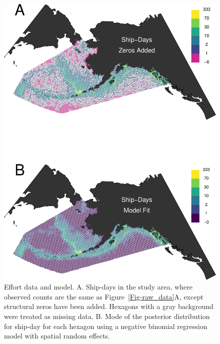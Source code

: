 \documentclass[11pt, titlepage]{article}
\begin{document}
\begin{spacing}{1.9}
\begin{flushleft}
\begin{figure}[H]
  \begin{center}
  \includegraphics[width=.75\linewidth]{figures/Fig-effort}
  \end{center}
  \caption{Effort data and model. A. Ship-days in the study area, where observed counts are the same as Figure~\ref{Fig-raw_data}A, except structural zeros have been added. Hexagons with a gray background were treated as missing data. B. Mode of the posterior distribution for ship-day for each hexagon using a negative binomial regression model with spatial random effects.  \label{Fig-Effort}}         
\end{figure} 


\end{flushleft}
\end{spacing}
\end{document}
